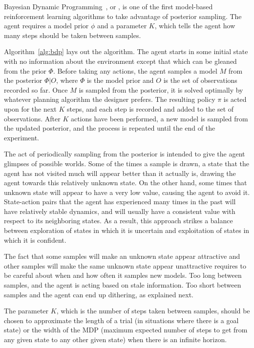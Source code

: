 Bayesian Dynamic Programming~\cite{strens00}, or , is one of the first model-based reinforcement learning algorithms to take advantage of posterior sampling. The agent requires a model prior $\phi$ and a parameter $K$, which tells the agent how many steps should be taken between samples.

Algorithm~\ref{alg:bdp} lays out the  algorithm. The agent starts in some initial state with no information about the environment except that which can be gleaned from the prior $\Phi$. Before taking any actions, the agent samples a model $M$ from the posterior $\Phi|O$, where $\Phi$ is the model prior and $O$ is the set of observations recorded so far. Once $M$ is sampled from the posterior, it is solved optimally by whatever planning algorithm the designer prefers. The resulting policy $\pi$ is acted upon for the next $K$ steps, and each step is recorded and added to the set of observations. After $K$ actions have been performed, a new model is sampled from the updated posterior, and the process is repeated until the end of the experiment.

The act of periodically sampling from the posterior is intended to give the agent glimpses of possible worlds. Some of the times a sample is drawn, a state that the agent has not visited much will appear better than it actually is, drawing the agent towards this relatively unknown state. On the other hand, some times that unknown state will appear to have a very low value, causing the agent to avoid it. State-action pairs that the agent has experienced many times in the past will have relatively stable dynamics, and will usually have a consistent value with respect to its neighboring states. As a result, this approach strikes a balance between exploration of states in which it is uncertain and exploitation of states in which it is confident.

The fact that some samples will make an unknown state appear attractive and other samples will make the same unknown state appear unattractive requires  to be careful about when and how often it samples new models. Too long between samples, and the agent is acting based on stale information.  Too short between samples and the agent can end up dithering, as explained next.

The parameter $K$, which is the number of steps taken between samples, should be chosen to approximate the length of a trial (in situations where there is a goal state) or the width of the MDP (maximum expected number of steps to get from any given state to any other given state) when there is an infinite horizon.

